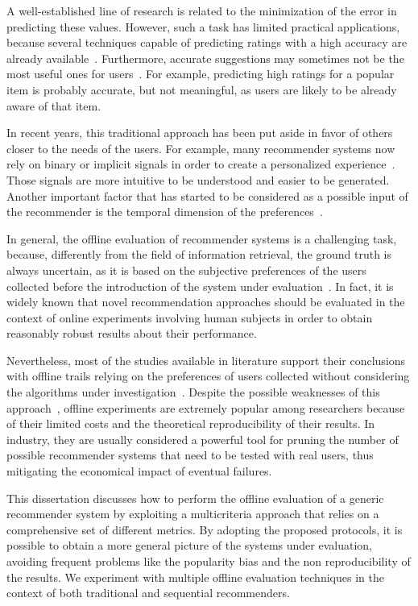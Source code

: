 A well-established line of research is related to the minimization of the error in predicting these values. However, such a task has limited practical applications, because several techniques capable of predicting ratings with a high accuracy are already available~\cite{Park2012}. Furthermore, accurate suggestions may sometimes not be the most useful ones for users~\cite{Herlocker2000}. For example, predicting high ratings for a popular item is probably accurate, but not meaningful, as users are likely to be already aware of that item.

In recent years, this traditional approach has been put aside in favor of others closer to the needs of the users. For example, many recommender systems now rely on binary or implicit signals in order to create a personalized experience~\cite{Gunawardana2015}. Those signals are more intuitive to be understood and easier to be generated. Another important factor that has started to be considered as a possible input of the recommender is the temporal dimension of the preferences~\cite{Quadrana2018}.

In general, the offline evaluation of recommender systems is a challenging task, because, differently from the field of information retrieval, the ground truth is always uncertain, as it is based on the subjective preferences of the users collected before the introduction of the system under evaluation~\cite{Herlocker2004}. In fact, it is widely known that novel recommendation approaches should be evaluated in the context of online experiments involving human subjects in order to obtain reasonably robust results about their performance.

Nevertheless, most of the studies available in literature support their conclusions with offline trails relying on the preferences of users collected without considering the algorithms under investigation~\cite{Gunawardana2015}. Despite the possible weaknesses of this approach~\cite{Said2014}, offline experiments are extremely popular among researchers because of their limited costs and the theoretical reproducibility of their results. In industry, they are usually considered a powerful tool for pruning the number of possible recommender systems that need to be tested with real users, thus mitigating the economical impact of eventual failures.

This dissertation discusses how to perform the offline evaluation of a generic recommender system by exploiting a multicriteria approach that relies on a comprehensive set of different metrics. By adopting the proposed protocols, it is possible to obtain a more general picture of the systems under evaluation, avoiding frequent problems like the popularity bias and the non reproducibility of the results. We experiment with multiple offline evaluation techniques in the context of both traditional and sequential recommenders.

